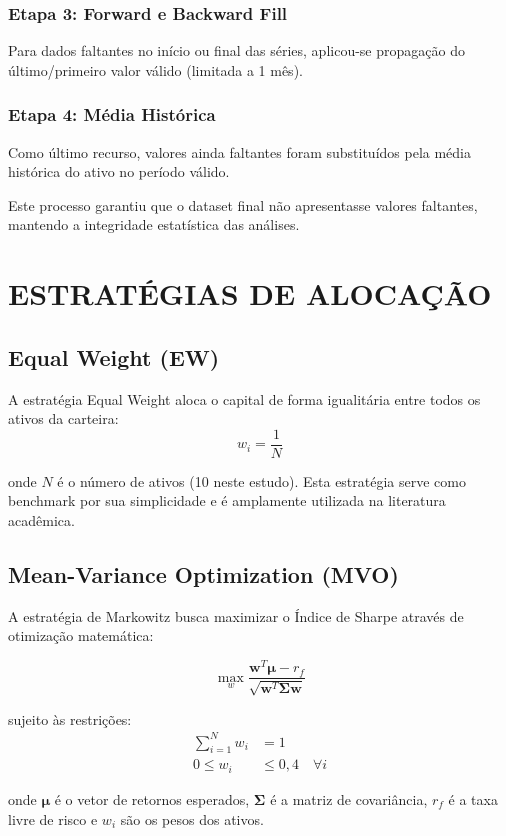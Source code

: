 \subsubsection{Etapa 3: Forward e Backward Fill}
Para dados faltantes no início ou final das séries, aplicou-se propagação do último/primeiro valor válido (limitada a 1 mês).

\subsubsection{Etapa 4: Média Histórica}
Como último recurso, valores ainda faltantes foram substituídos pela média histórica do ativo no período válido.

Este processo garantiu que o dataset final não apresentasse valores faltantes, mantendo a integridade estatística das análises.

\section{ESTRATÉGIAS DE ALOCAÇÃO}

\subsection{Equal Weight (EW)}

A estratégia Equal Weight aloca o capital de forma igualitária entre todos os ativos da carteira:
$$w_i = \frac{1}{N}$$

onde $N$ é o número de ativos (10 neste estudo). Esta estratégia serve como benchmark por sua simplicidade e é amplamente utilizada na literatura acadêmica.

\subsection{Mean-Variance Optimization (MVO)}

A estratégia de Markowitz busca maximizar o Índice de Sharpe através de otimização matemática:

$$\max_{w} \frac{\boldsymbol{w}^T \boldsymbol{\mu} - r_f}{\sqrt{\boldsymbol{w}^T \boldsymbol{\Sigma} \boldsymbol{w}}}$$

sujeito às restrições:
\begin{align}
\sum_{i=1}^{N} w_i &= 1 \\
0 \leq w_i &\leq 0,4 \quad \forall i
\end{align}

onde $\boldsymbol{\mu}$ é o vetor de retornos esperados, $\boldsymbol{\Sigma}$ é a matriz de covariância, $r_f$ é a taxa livre de risco e $w_i$ são os pesos dos ativos.

